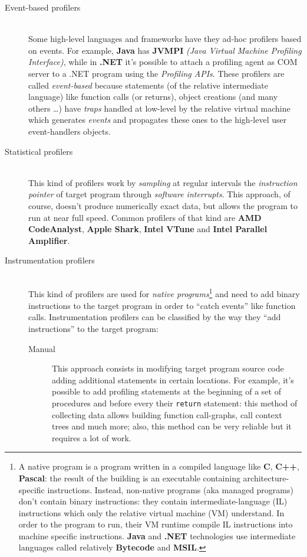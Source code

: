 \documentclass[a4paper,11pt]{report}
\begin{document}
\begin{description}
\item[Event-based profilers] \hfill \\
Some high-level languages and frameworks have they ad-hoc profilers based on
events. For example, \textbf{Java} has \textbf{JVMPI} \textit{(Java Virtual
Machine Profiling Interface)}, while in \textbf{.NET} it's possible to attach a
profiling agent as COM server to a .NET program using the \emph{Profiling APIs}.
These profilers are called \emph{event-based} because statements (of the
relative intermediate language) like function calls (or returns), object
creations (and many others \ldots) have \emph{traps} handled at low-level by the
relative virtual machine which generates \emph{events} and propagates these ones
to the high-level user event-handlers objects.

\item[Statistical profilers] \hfill \\
This kind of profilers work by \emph{sampling} at regular intervals the
\emph{instruction pointer} of target program through \emph{software interrupts}.
This approach, of course, doesn't produce numerically exact data, but allows the
program to run at near full speed. Common profilers of that kind are \textbf{AMD
CodeAnalyst}, \textbf{Apple Shark}, \textbf{Intel VTune} and \textbf{Intel
Parallel Amplifier}.

\item[Instrumentation profilers] \hfill \\
This kind of profilers are used for \emph{native programs}\footnote{A native
program is a program written in a compiled language like \textbf{C},
\textbf{C++}, \textbf{Pascal}: the result of the building is an executable
containing architecture-specific instructions. Instead, non-native programs (aka
managed programs) don't contain binary instructions: they contain
intermediate-language (IL) instructions which only the relative virtual machine
(VM) understand. In order to the program to run, their VM runtime compile IL
instructions into machine specific instructions. \textbf{Java} and \textbf{.NET}
technologies use intermediate languages called relatively \textbf{Bytecode} and
\textbf{MSIL}.} and need to add binary instructions to the target program in
order to ``catch events'' like function calls. Instrumentation profilers can be
classified by the way they ``add instructions'' to the target program:

\begin{description}
\item[Manual]
This approach consists in modifying target program source code adding additional
statements in certain locations. For example, it's possible to add profiling
statements at the beginning of a set of procedures and before every their
\verb|return| statement: this method of collecting data allows building function
call-graphs, call context trees and much more; also, this method can be very
reliable but it requires a lot of work.


\end{description}
\end{description}
\end{document}
